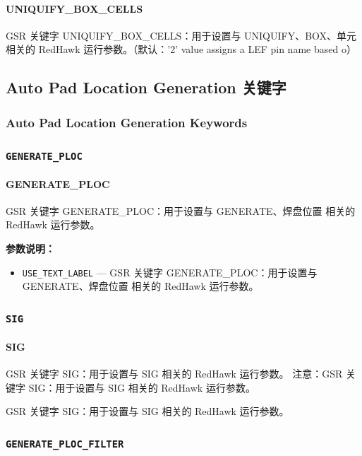 \paragraph*{UNIQUIFY_BOX_CELLS}

GSR 关键字 UNIQUIFY_BOX_CELLS：用于设置与 UNIQUIFY、BOX、单元 相关的 RedHawk 运行参数。（默认：'2' value assigns a LEF pin name based o）

\subsection{Auto Pad Location Generation 关键字}
\subsubsection*{Auto Pad Location Generation Keywords}

\subsubsection{\texttt{GENERATE_PLOC}}
\paragraph*{GENERATE_PLOC}

GSR 关键字 GENERATE_PLOC：用于设置与 GENERATE、焊盘位置 相关的 RedHawk 运行参数。

\textbf{参数说明：}
\begin{itemize}
\item \texttt{USE\_TEXT\_LABEL} — GSR 关键字 GENERATE\_PLOC：用于设置与 GENERATE、焊盘位置 相关的 RedHawk 运行参数。
\end{itemize}

\subsubsection{\texttt{SIG}}
\paragraph*{SIG}

GSR 关键字 SIG：用于设置与 SIG 相关的 RedHawk 运行参数。 注意：GSR 关键字 SIG：用于设置与 SIG 相关的 RedHawk 运行参数。

\begin{noteBox}
GSR 关键字 SIG：用于设置与 SIG 相关的 RedHawk 运行参数。
\end{noteBox}

\subsubsection{\texttt{GENERATE_PLOC_FILTER}}
